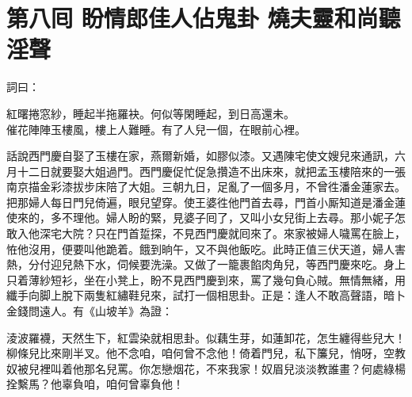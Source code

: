 
\chapter*{第八囘 盼情郎佳人佔鬼卦 燒夫靈和尚聽淫聲}


詞曰：

\begin{myquote} 
紅曙捲窓紗，睡起半拖羅袂。何似等閑睡起，到日高還未。\\催花陣陣玉樓風，樓上人難睡。有了人兒一個，在眼前心裡。
\end{myquote} 

話說西門慶自娶了玉樓在家，燕爾新婚，如膠似漆。又遇陳宅使文嫂兒來通訊，六月十二日就要娶大姐過門。西門慶促忙促急攢造不出床來，就把孟玉樓陪來的一張南京描金彩漆拔步床陪了大姐。三朝九日，足亂了一個多月，不曾徃潘金蓮家去。把那婦人每日門兒倚遍，眼兒望穿。使王婆徃他門首去尋，門首小厮知道是潘金蓮使來的，多不理他。婦人盼的緊，見婆子囘了，又叫小女兒街上去尋。那小妮子怎敢入他深宅大院？只在門首踅探，不見西門慶就囘來了。來家被婦人噦罵在臉上，恠他沒用，便要叫他跪着。餓到晌午，又不與他飯吃。此時正值三伏天道，婦人害熱，分付迎兒熱下水，伺候要洗澡。又做了一籠裹餡肉角兒，等西門慶來吃。身上只着薄紗短衫，坐在小凳上，盼不見西門慶到來，罵了幾句負心賊。無情無緒，用纖手向脚上脫下兩隻紅繡鞋兒來，試打一個相思卦。正是：逢人不敢高聲語，暗卜金錢問遠人。有《山坡羊》為證：

\begin{myquote} 
淩波羅襪，天然生下，紅雲染就相思卦。似藕生芽，如蓮卸花，怎生纏得些兒大！柳條兒比來剛半叉。他不念咱，咱何曾不念他！倚着門兒，私下簾兒，悄呀，空教奴被兒裡叫着他那名兒罵。你怎戀烟花，不來我家！奴眉兒淡淡教誰畫？何處綠楊拴繫馬？他辜負咱，咱何曾辜負他！
\end{myquote} 

